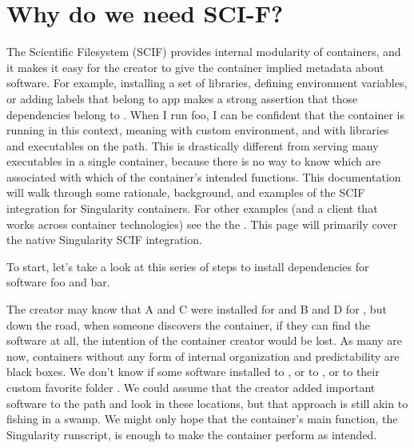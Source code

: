 \documentclass[letterpaper,10pt,english]{sphinxmanual}
\begin{document}
\section{Why do we need SCI-F?}
\label{\detokenize{reproducible_scif_apps:why-do-we-need-sci-f}}\label{\detokenize{reproducible_scif_apps:sec-scifapps}}
The Scientific Filesystem (SCIF) provides internal modularity of
containers, and it makes it easy for the creator to give the container
implied metadata about software. For example, installing a set of
libraries, defining environment variables, or adding labels that
belong to app  makes a strong assertion that those dependencies belong
to  . When I run foo, I can be confident that the container is running
in this context, meaning with  custom environment, and with  libraries
and executables on the path. This is drastically different from
serving many executables in a single container, because there is no
way to know which are associated with which of the container’s
intended functions. This documentation will walk through some
rationale, background, and examples of the SCIF integration for
Singularity containers. For other examples (and a client that works
across container technologies) see the the .
This page will primarily cover the native Singularity SCIF
integration.

To start, let’s take a look at this series of steps to install
dependencies for software foo and bar.

%
\begin{sphinxVerbatim}[commandchars=\\\{\}]






\end{sphinxVerbatim}

The creator may know that A and C were installed for  and B and D for  ,
but down the road, when someone discovers the container, if they can
find the software at all, the intention of the container creator would
be lost. As many are now, containers without any form of internal
organization and predictability are black boxes. We don’t know if some
software installed to  , or to   , or to their custom favorite folder  . We
could assume that the creator added important software to the path and
look in these locations, but that approach is still akin to fishing in a
swamp. We might only hope that the container’s main function, the
Singularity runscript, is enough to make the container perform as
intended.
\end{document}
